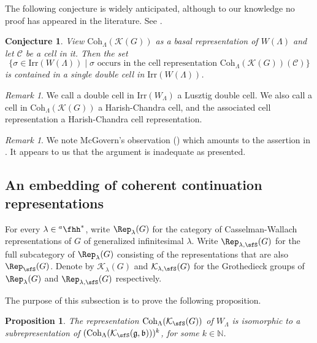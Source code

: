 \documentclass[12pt,a4paper]{amsart}
\newcommand{\BN}{{\mathbb {N}}}
\newcommand{\CC}{{\mathcal {C}}}
\newcommand{\CK}{{\mathcal {K}}}
\newcommand{\g}{\mathfrak g}
\renewcommand{\b}{\mathfrak b}
\numberwithin{equation}{section}
\newtheorem{prop}[thm]{Proposition}
\newtheorem{conj}[thm]{Conjecture}
\theoremstyle{remark}
\newtheorem{remark}[thm]{Remark}
\def\Irr{\mathrm{Irr}}
\def\hha{{}^a\fhh}
\def\Coh{\mathrm{Coh}}
\begin{document}
The following conjecture is widely anticipated, although to our knowledge no proof has appeared in the literature. See \cite[page 1055]{V4}.

\begin{conj}\label{conjcell}
View  $\Coh_{\Lambda}(\CK(G))$ as a basal representation of $W(\Lambda)$ and let $\CC$ be a cell in it.  Then the set
\[
 \{ \sigma\in \Irr(W(\Lambda))\mid \sigma\textrm{ occurs in the cell representation $\Coh_{\Lambda}( \CK(G))(\CC)$}\}
\]
is contained in a single double cell in $\Irr(W(\Lambda))$.
\end{conj}

\begin{remark}
We call a double cell in  $\Irr(W_\Lambda)$ a Lusztig double cell. We also call a cell in  $\Coh_{\Lambda}( \CK(G))$ a Harish-Chandra cell, and the associated cell representation a Harish-Chandra cell representation.
\end{remark}

\begin{remark}
We note McGovern's observation (\cite[Page 213]{Mc}) which amounts to the assertion in . It appears to us that the argument is inadequate as presented.
\end{remark}



\subsection{An embedding of  coherent continuation representations}


For every $\lambda\in\hha^*$, write $\Rep_\lambda(G)$ for the category of Casselman-Wallach representations of $G$ of generalized infinitesimal $\lambda$.
Write $\Rep_{\lambda, \sfS}(G)$ for the full subcategory of $\Rep_\lambda(G)$ consisting of the representations that are also $\Rep_\sfS(G)$.
Denote by $\CK_\lambda(G)$ and  $\CK_{\lambda, \sfS}(G)$ for the Grothedieck groups of  $\Rep_{\lambda}(G)$ and $\Rep_{\lambda, \sfS}(G)$ respectively.


The purpose of this subsection is to prove the following proposition.

 \begin{prop}\label{lem0033}
The representation $\Coh_{\Lambda}(\CK_\sfS(G))$  of $W_{\Lambda}$ is isomorphic to a subrepresentation of $(\Coh_{\Lambda}(\CK_\sfS(\g,\b)))^k$, for some $k\in \BN$.
     \end{prop}
\end{document}
